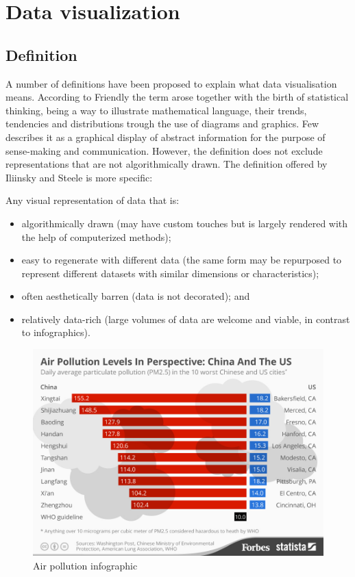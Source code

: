 \section{Data visualization}

\subsection{Definition}
A number of definitions have been proposed to explain what data visualisation means. According to Friendly \cite{Friendly2009} the term arose together with the birth of statistical thinking, being a way to illustrate mathematical language, their trends, tendencies and distributions trough the use of diagrams and graphics. Few \cite{StephenFew2013} describes it as a graphical display of abstract information for the purpose of sense-making and communication. 
However, the definition does not exclude representations that are not algorithmically drawn. The definition offered by Iliinsky and Steele \cite{Iliinsky2011} is more specific: 
\begin{displayquote}
Any visual representation of data that is:
	\begin{itemize}
	\item algorithmically drawn (may have custom touches but is largely rendered with the help of computerized methods);
	\item easy to regenerate with different data (the same form may be repurposed to represent different datasets with similar dimensions or characteristics);
	\item often aesthetically barren (data is not decorated); and
	\item relatively data-rich (large volumes of data are welcome and viable, in contrast to infographics).
    \end{itemize}
\end{displayquote}
\iffalse
\begin{figure}[h]
  \centering
  \begin{adjustbox}{width=.8\textwidth,center=\textwidth}
  \includegraphics[scale=1]{images/air_pollution_infographic.jpg}
  \end{adjustbox}
  \caption[Air pollution infographic]{Air pollution infographic \cite{NiallMcCarthy}}
  \label{fig:air_pollution_infographic}
\end{figure}
